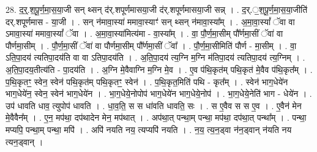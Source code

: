\documentclass[17pt]{extarticle}
\begin{document}
28. द॒र्॒.श॒पू॒र्ण॒मा॒स॒या॒जी सन् थ्सन् द॑र्.शपूर्णमासया॒जी द॑र्.शपूर्णमासया॒जी सन्न् । . द॒र्.॒श॒पू॒र्ण॒मा॒स॒या॒जीति॑ दर्.शपूर्णमास - या॒जी । . सन् न॑मावा॒स्या॑ ममावा॒स्याꣳ॑ सन् थ्सन् न॑मावा॒स्या᳚म् । . अ॒मा॒वा॒स्यां᳚ ॅवा वा ऽमावा॒स्या॑ ममावा॒स्यां᳚ ॅवा । . अ॒मा॒वा॒स्या॑मित्य॑मा - वा॒स्या᳚म् । . वा॒ पौ॒र्ण॒मा॒सीम् पौ᳚र्णमा॒सीं ॅवा॑ वा पौर्णमा॒सीम् । . पौ॒र्ण॒मा॒सीं ॅवा॑ वा पौर्णमा॒सीम् पौ᳚र्णमा॒सीं ॅवा᳚ । . पौ॒र्ण॒मा॒सीमिति॑ पौर्ण - मा॒सीम् । . वा॒ ऽति॒पा॒दय॑ त्यतिपा॒दय॑ति वा वा ऽतिपा॒दय॑ति । . अ॒ति॒पा॒दय॑ त्य॒ग्नि म॒ग्नि म॑तिपा॒दय॑ त्यतिपा॒दय॑ त्य॒ग्निम् । . अ॒ति॒पा॒दय॒तीत्य॑ति - पा॒दय॑ति । . अ॒ग्नि मे॒वैवाग्नि म॒ग्नि मे॒व । . ए॒व प॑थि॒कृत॑म् पथि॒कृत॑ मे॒वैव प॑थि॒कृत᳚म् । . प॒थि॒कृतꣳ॒॒ स्वेन॒ स्वेन॑ पथि॒कृत॑म् पथि॒कृतꣳ॒॒ स्वेन॑ । . प॒थि॒कृत॒मिति॑ पथि - कृत᳚म् । . स्वेन॑ भाग॒धेये॑न भाग॒धेये॑न॒ स्वेन॒ स्वेन॑ भाग॒धेये॑न । . भा॒ग॒धेये॒नोपोप॑ भाग॒धेये॑न भाग॒धेये॒नोप॑ । . भा॒ग॒धेये॒नेति॑ भाग - धेये॑न । . उप॑ धावति धाव॒ त्युपोप॑ धावति । . धा॒व॒ति॒ स स धा॑वति धावति॒ सः । . स ए॒वैव स स ए॒व । . ए॒वैन॑ मेन मे॒वैवैन᳚म् । . ए॒न॒ मप॑था॒ दप॑थादेन मेन॒ मप॑थात् । . अप॑था॒त् पन्था॒म् पन्था॒ मप॑था॒ दप॑था॒त् पन्था᳚म् । . पन्था॒ मप्यपि॒ पन्था॒म् पन्था॒ मपि॑ । . अपि॑ नयति नय॒ त्यप्यपि॑ नयति । . न॒य॒ त्य॒न॒ड्वा न॑न॒ड्वान् न॑यति नय त्यन॒ड्वान् । \newline
\end{document}
